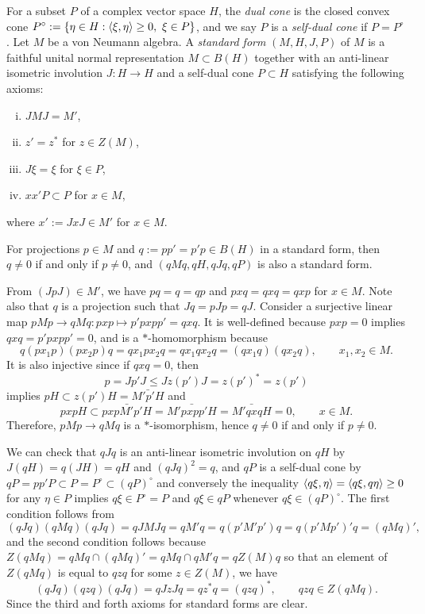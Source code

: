 \documentclass{../../large}
\begin{document}
\begin{prb}
For a subset $P$ of a complex vector space $H$, the \emph{dual cone} is the closed convex cone $P^\circ:=\{\eta\in H:\<\xi,\eta\>\ge0,\ \xi\in P\}$, and we say $P$ is a \emph{self-dual cone} if $P=P^\circ$.
Let $M$ be a von Neumann algebra.
A \emph{standard form} $(M,H,J,P)$ of $M$ is a faithful unital normal representation $M\subset B(H)$ together with an anti-linear isometric involution $J:H\to H$ and a self-dual cone $P\subset H$ satisfying the following axioms:
\begin{enumerate}[(i)]
\item $JMJ=M'$,
\item $z'=z^*$ for $z\in Z(M)$,
\item $J\xi=\xi$ for $\xi\in P$,
\item $xx'P\subset P$ for $x\in M$,
\end{enumerate}
where $x':=JxJ\in M'$ for $x\in M$.
\begin{parts}
\item For projections $p\in M$ and $q:=pp'=p'p\in B(H)$ in a standard form, then $q\ne0$ if and only if $p\ne0$, and $(qMq,qH,qJq,qP)$ is also a standard form.
\end{parts}
\end{prb}
\begin{pf}
From $(JpJ)\in M'$, we have $pq=q=qp$ and $pxq=qxq=qxp$ for $x\in M$.
Note also that $q$ is a projection such that $Jq=pJp=qJ$.
Consider a surjective linear map $pMp\to qMq:pxp\mapsto p'pxpp'=qxq$.
It is well-defined because $pxp=0$ implies $qxq=p'pxpp'=0$, and is a $*$-homomorphism because
\[q(px_1p)(px_2p)q=qx_1px_2q=qx_1qx_2q=(qx_1q)(qx_2q),\qquad x_1,x_2\in M.\]
It is also injective since if $qxq=0$, then
\[p=Jp'J\le Jz(p')J=z(p')^*=z(p')\]
implies $pH\subset z(p')H=\bar{M'p'H}$ and
\[pxpH\subset\bar{pxpM'p'H}=\bar{M'pxpp'H}=\bar{M'qxqH}=0,\qquad x\in M.\]
Therefore, $pMp\to qMq$ is a $*$-isomorphism, hence $q\ne0$ if and only if $p\ne0$.

We can check that $qJq$ is an anti-linear isometric involution on $qH$ by $J(qH)=q(JH)=qH$ and $(qJq)^2=q$, and $qP$ is a self-dual cone by $qP=pp'P\subset P=P^\circ\subset(qP)^\circ$ and conversely the inequality $\langle q\xi,\eta\rangle=\langle q\xi,q\eta\rangle\ge0$ for any $\eta\in P$ implies $q\xi\in P^\circ=P$ and $q\xi\in qP$ whenever $q\xi\in(qP)^\circ$.
The first condition follows from
\[(qJq)(qMq)(qJq)=qJMJq=qM'q=q(p'M'p')q=q(p'Mp')'q=(qMq)',\]
and the second condition follows because $Z(qMq)=qMq\cap(qMq)'=qMq\cap qM'q=qZ(M)q$ so that an element of $Z(qMq)$ is equal to $qzq$ for some $z\in Z(M)$, we have
\[(qJq)(qzq)(qJq)=qJzJq=qz^*q=(qzq)^*,\qquad qzq\in Z(qMq).\]
Since the third and forth axioms for standard forms are clear.
\end{pf}
\end{document}

